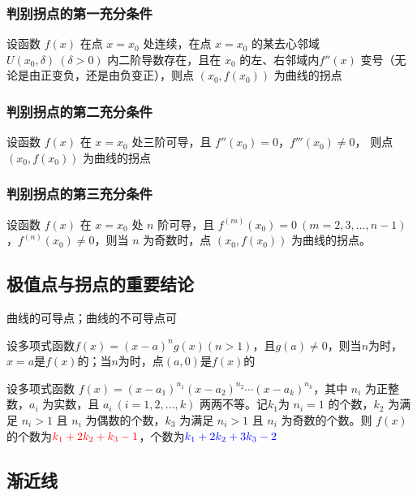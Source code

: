 \documentclass[../book.tex]{subfiles}
\begin{document}
    \subsubsection{判别拐点的第一充分条件}

    设函数 $f(x)$ 在点 $x=x_0$ 处连续，在点 $ x = x_0$ 的某去心邻域$U(x_0,\delta)\ (\delta>0)$ 内二阶导数存在，且在 $x_0$ 的左、右邻域内$f''(x)$ 变号（无论是由正变负，还是由负变正），则点 $(x_0,f(x_0))$ 为曲线的拐点

    \subsubsection{判别拐点的第二充分条件}

    设函数 $f(x)$ 在 $x=x_0$ 处三阶可导，且 $f''(x_0)=0$，$f'''(x_0)\neq 0$， 则点 $(x_0,f(x_0))$ 为曲线的拐点

    \subsubsection{判别拐点的第三充分条件}

    设函数 $f(x)$ 在 $x=x_0$ 处 $n$ 阶可导，且 $f^{(m)}(x_0)=0\ (m=2,3,\dots,n-1)$，$f^{(n)}(x_0)\neq 0$，则当 $n$ 为奇数时，点 $(x_0,f(x_0))$ 为曲线的拐点。

    \subsection{极值点与拐点的重要结论}

    \begin{circlenum}
        \item 曲线的可导点{}；曲线的不可导点可{}
        \item 设多项式函数$f(x) = (x-a)^{n}g(x)(n>1)$，且$g(a) \neq 0$，则当$n$为{\color{red}{偶数}}时，$x=a$是$f(x)$的{\color{red}{极值点}}；当$n$为{\color{red}{奇数}}时，点$(a, 0)$是$f(x)$的{\color{red}{拐点}}
        \item 设多项式函数 $f(x)= (x-a_1)^{n_1}(x-a_2)^{n_2}\cdots(x-a_k)^{n_k}$，其中 $n_i$ 为正整数，$a_i$ 为实数，且 $a_i\ (i=1,2,\dots,k)$ 两两不等。记$k_1$为 $n_i=1$ 的个数，$k_2$ 为满足 $n_i>1$ 且 $n_i$ 为偶数的个数，$k_3$ 为满足 $n_i>1$ 且 $n_i$ 为奇数的个数。则 $f(x)$ 的{\color{red}{极值点}}个数为$\color{red}{k_1 + 2k_2 + k_3 - 1}$，{\color{blue}{拐点}}个数为$\color{blue}{k_1 + 2k_2 + 3k_3 - 2}$
    \end{circlenum}

    \subsection{渐近线}
\end{document}

